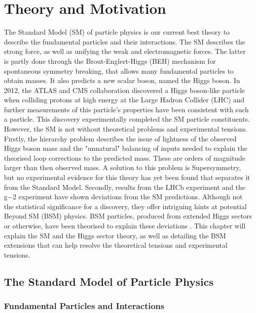 \chapter{Theory and Motivation}

The Standard Model (SM) of particle physics is our current best theory to describe the fundamental particles and their interactions.
The SM describes the strong force, as well as unifying the weak and electromagnetic forces.
The latter is partly done through the Brout-Englert-Higgs (BEH) mechanism for spontaneous symmetry breaking, that allows many fundamental particles to obtain masses.
It also predicts a new scalar boson, named the Higgs boson.
In 2012, the ATLAS \cite{ATLAS_Higgs_Discovery} and CMS collaboration \cite{CMS_Higgs_Discovery} discovered a Higgs boson-like particle when colliding protons at high energy at the Large Hadron Collider (LHC) and further measurements of this particle's properties have been consistent with such a particle.
This discovery experimentally completed the SM particle constituents. \\

However, the SM is not without theoretical problems and experimental tensions.
Firstly, the hierarchy problem describes the issue of lightness of the observed Higgs boson mass and the "unnatural" balancing of inputs needed to explain the theorised loop corrections to the predicted mass. 
These are orders of magnitude larger than then observed mass.
A solution to this problem is Supersymmetry, but no experimental evidence for this theory has yet been found that separates it from the Standard Model. 
Secondly, results from the LHCb experiment \cite{} and the g−2 experiment \cite{} have shown deviations from the SM predictions.
Although not the statistical significance for a discovery, they offer intriguing hints at potential Beyond SM (BSM) physics.
BSM particles, produced from extended Higgs sectors or otherwise, have been theorised to explain these deviations .
This chapter will explain the SM and the Higgs sector theory, as well as detailing the BSM extensions that can help resolve the theoretical tensions and experimental tensions.

\section{The Standard Model of Particle Physics}

\subsection{Fundamental Particles and Interactions}

